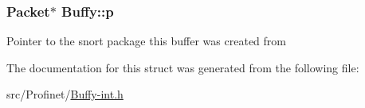 \subsubsection[{p}]{\setlength{\rightskip}{0pt plus 5cm}Packet$\ast$ Buffy\+::p}\label{struct_buffy_a31f5f80e4d23a823a8a7e9e26341600b}
Pointer to the snort package this buffer was created from 

The documentation for this struct was generated from the following file\+:\begin{DoxyCompactItemize}
\item 
src/\+Profinet/\hyperlink{_buffy-int_8h}{Buffy-\/int.\+h}\end{DoxyCompactItemize}
